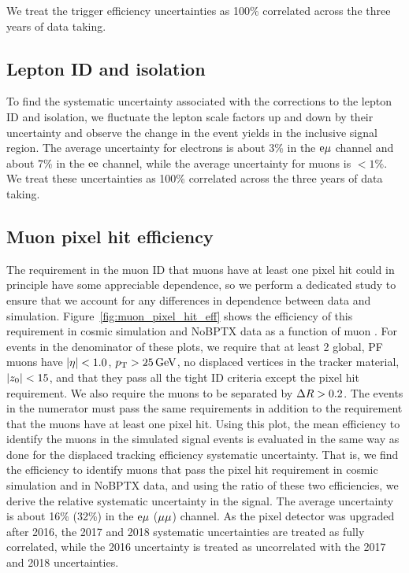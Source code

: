 We treat the trigger efficiency uncertainties as 100\% correlated across the three years of data taking.



\subsection{Lepton ID and isolation}
To find the systematic uncertainty associated with the corrections to the lepton ID and isolation, we fluctuate the lepton scale factors up and down by their uncertainty and observe the change in the event yields in the inclusive signal region. The average uncertainty for electrons is about 3\% in the $\mathrm{e}{\mu}$ channel and about 7\% in the $\mathrm{e}\mathrm{e}$ channel, while the average uncertainty for muons is $< 1\%$. We treat these uncertainties as 100\% correlated across the three years of data taking.

\subsection{Muon pixel hit efficiency}
The requirement in the muon ID that muons have at least one pixel hit could in principle have some appreciable \ad dependence, so we perform a dedicated study to ensure that we account for any differences in \ad dependence between data and simulation. Figure~\ref{fig:muon_pixel_hit_eff} shows the efficiency of this requirement in cosmic simulation and NoBPTX data as a function of muon \ad. For events in the denominator of these plots, we require  that at least 2 global, PF muons have $\lvert \eta \rvert<1.0$, $p_{\mathrm{T}}>25\,\text{Ge\hspace{-.08em}V}$, no displaced vertices in the tracker material, $\az<15\unit{cm}$, and that they pass all the tight ID criteria except the pixel hit requirement. We also require the muons to be separated by $\Delta R>0.2$. The events in the numerator must pass the same requirements in addition to the requirement that the muons have at least one pixel hit. Using this plot, the mean efficiency to identify the muons in the simulated signal events is evaluated in the same way as done for the displaced tracking efficiency systematic uncertainty. That is, we find the efficiency to identify muons that pass the pixel hit requirement in cosmic simulation and in NoBPTX data, and using the ratio of these two efficiencies, we derive the relative systematic uncertainty in the signal. The average uncertainty is about 16\% (32\%) in the $\mathrm{e}{\mu}$ (${\mu}{\mu}$) channel. As the pixel detector was upgraded after 2016, the 2017 and 2018 systematic uncertainties are treated as fully correlated, while the 2016 uncertainty is treated as uncorrelated with the 2017 and 2018 uncertainties.

